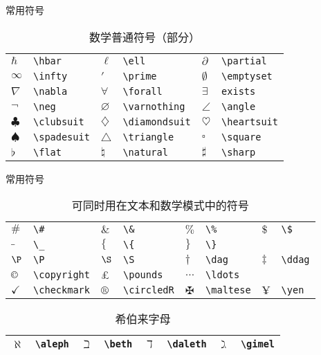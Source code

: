 \begin{frame}[fragile]{常用符号}
	\begin{table}\caption{数学普通符号（部分）}
		\begin{tabular}{llllll}
			\toprule
			$\hbar$ & \verb|\hbar| & $\ell$ & \verb|\ell| & $\partial$ & \verb|\partial| \\
			$\infty$ & \verb|\infty| & $\prime$ & \verb|\prime| & $\emptyset$ & \verb|\emptyset| \\
			$\nabla$ & \verb|\nabla| & $\forall$ & \verb|\forall| & $\exists$ & \verb|exists| \\
			$\neg$ & \verb|\neg| & $\varnothing$ & \verb|\varnothing| & $\angle$ & \verb|\angle| \\
			$\clubsuit$ & \verb|\clubsuit| & $\diamondsuit$ & \verb|\diamondsuit| & $\heartsuit$ & \verb|\heartsuit| \\
			$\spadesuit$ & \verb|\spadesuit| & $\triangle$ & \verb|\triangle| & $\square$ & \verb|\square| \\
			$\flat$ & \verb|\flat| & $\natural$ & \verb|\natural| & $\sharp$ & \verb|\sharp|\\
			\bottomrule
		\end{tabular}
	\end{table}
\end{frame}
\begin{frame}[fragile]{常用符号}
	\begin{table}\caption{可同时用在文本和数学模式中的符号}
		\begin{tabular}{llllllll}
			\toprule
			$\#$ & \verb|\#| & $\&$ & \verb|\&| & $\%$ & \verb|\%| & $\$$ & \verb|\$| \\
			$\_$ & \verb|\_| & $\{$ & \verb|\{| & $\}$ & \verb|\}| & & \\
			$\P$ & \verb|\P| & $\S$ & \verb|\S| & $\dag$ & \verb|\dag| & $\ddag$ & \verb|\ddag| \\
			$\copyright$ & \verb|\copyright| & $\pounds$ & \verb|\pounds| & $\ldots$ & \verb|\ldots| & & \\
			$\checkmark$ & \verb|\checkmark| & $\circledR$ & \verb|\circledR| & $\maltese$ & \verb|\maltese| & $\yen$ & \verb|\yen| \\
			\bottomrule
		\end{tabular}
	\end{table}
	\begin{table}\caption{希伯来字母}
		\begin{tabular}{llllllll}
			\toprule
			$\aleph$ & \verb|\aleph| & $\beth$ & \verb|\beth| & $\daleth$ & \verb|\daleth| & $\gimel$ & \verb|\gimel| \\
			\bottomrule
		\end{tabular}
	\end{table}
\end{frame}
